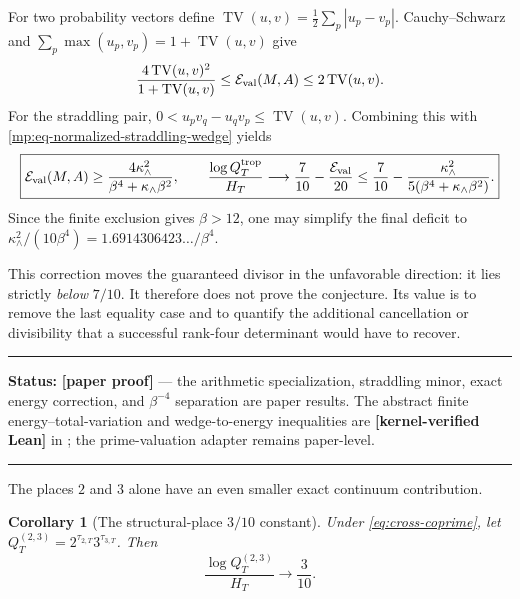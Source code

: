 \documentclass[11pt,oneside]{article}
\newtheorem{corollary}[theorem]{Corollary}
\theoremstyle{definition}
\theoremstyle{remark}
\newcommand{\lean}[1]{\texttt{\detokenize{#1}}}
\newcommand{\statuslean}{\textcolor{leanblue}{\textbf{[kernel-verified Lean]}}}
\newcommand{\statusnew}{\textcolor{newgreen}{\textbf{[paper proof]}}}
\newenvironment{statusbox}[1]
{\begin{center}\begin{minipage}{0.94\textwidth}\raggedright\hbadness=10000\hrule
\vspace{0.45em}\textbf{Status:} #1\par\vspace{0.35em}}
{\vspace{0.35em}\hrule\end{minipage}\end{center}}
\begin{document}
For two probability vectors define
$\operatorname{TV}(u,v)=\frac12\sum_p|u_p-v_p|$.  Cauchy--Schwarz and
$\sum_p\max(u_p,v_p)=1+\operatorname{TV}(u,v)$ give
\begin{equation}
 \frac{4\operatorname{TV}(u,v)^2}{1+\operatorname{TV}(u,v)}
 \le\mathcal E_{\rm val}(M,A)
 \le2\operatorname{TV}(u,v).
 \label{mp:eq-energy-tv}
\end{equation}
For the straddling pair,
$0<u_pv_q-u_qv_p\le\operatorname{TV}(u,v)$.  Combining this with
\eqref{mp:eq-normalized-straddling-wedge} yields
\begin{equation}
 \boxed{
 \mathcal E_{\rm val}(M,A)
 \ge\frac{4\kappa_{\wedge}^2}
          {\beta^4+\kappa_{\wedge}\beta^2},\qquad
 \frac{\log Q_T^{\mathrm{trop}}}{H_T}
 \longrightarrow\frac7{10}-\frac{\mathcal E_{\rm val}}{20}
 \le\frac7{10}-
 \frac{\kappa_{\wedge}^2}{5(\beta^4+\kappa_{\wedge}\beta^2)}.}
 \label{mp:eq-explicit-energy-gap}
\end{equation}
Since the finite exclusion gives $\beta>12$, one may simplify the final deficit to
$\kappa_{\wedge}^2/(10\beta^4)=1.6914306423\ldots/\beta^4$.

This correction moves the guaranteed divisor in the unfavorable direction: it lies
strictly \emph{below} $7/10$.  It therefore does not prove the conjecture.  Its value is to
remove the last equality case and to quantify the additional cancellation or divisibility
that a successful rank-four determinant would have to recover.

\begin{statusbox}{\statusnew{} --- the arithmetic specialization, straddling minor, exact
energy correction, and $\beta^{-4}$ separation are paper results.  The abstract finite
energy--total-variation and wedge-to-energy inequalities are \statuslean{} in
\lean{ValuationSlopeEnergy}; the prime-valuation adapter remains paper-level.}
\end{statusbox}

The places $2$ and $3$ alone have an even smaller exact continuum contribution.

\begin{corollary}[The structural-place $3/10$ constant]\label{cor:three-tenths}
Under \eqref{eq:cross-coprime}, let
$Q_T^{(2,3)}=2^{\tau_{2,T}}3^{\tau_{3,T}}$.  Then
\begin{equation}\label{eq:three-tenths}
  \frac{\log Q_T^{(2,3)}}{H_T}\longrightarrow\frac3{10}.
\end{equation}
\end{corollary}
\end{document}

